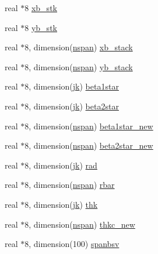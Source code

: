 \begin{DoxyCompactItemize}
\item 
real $\ast$8 \hyperlink{namespaceglobvar_ab9824c9f8dcc0e337df800037acfff86}{xb\+\_\+stk}
\item 
real $\ast$8 \hyperlink{namespaceglobvar_a50b0561e08ecd21444c8d0138e8f23f8}{yb\+\_\+stk}
\item 
real $\ast$8, dimension(\hyperlink{namespaceglobvar_adeb7d084c25deee7802eab03d40830c5}{nspan}) \hyperlink{namespaceglobvar_ac7d10e840db27451a3d4f7281e998936}{xb\+\_\+stack}
\item 
real $\ast$8, dimension(\hyperlink{namespaceglobvar_adeb7d084c25deee7802eab03d40830c5}{nspan}) \hyperlink{namespaceglobvar_ab911e9efe95d91973d67032e07c25b6e}{yb\+\_\+stack}
\item 
real $\ast$8, dimension(\hyperlink{namespaceglobvar_a63113b636acdd2b247b3e2df6cdac555}{jk}) \hyperlink{namespaceglobvar_abb730f89383edc04d1631f6dc16ad5c6}{beta1star}
\item 
real $\ast$8, dimension(\hyperlink{namespaceglobvar_a63113b636acdd2b247b3e2df6cdac555}{jk}) \hyperlink{namespaceglobvar_a1504d995004c2c3cd93ac71f6c9028e0}{beta2star}
\item 
real $\ast$8, dimension(\hyperlink{namespaceglobvar_adeb7d084c25deee7802eab03d40830c5}{nspan}) \hyperlink{namespaceglobvar_a9b66a28ec78457551885e4ad3091f8fe}{beta1star\+\_\+new}
\item 
real $\ast$8, dimension(\hyperlink{namespaceglobvar_adeb7d084c25deee7802eab03d40830c5}{nspan}) \hyperlink{namespaceglobvar_aa2687515a32abc133ab720b0690976ba}{beta2star\+\_\+new}
\item 
real $\ast$8, dimension(\hyperlink{namespaceglobvar_a63113b636acdd2b247b3e2df6cdac555}{jk}) \hyperlink{namespaceglobvar_a66d44e4ebb72e4d0700987fd6cff1e02}{rad}
\item 
real $\ast$8, dimension(\hyperlink{namespaceglobvar_adeb7d084c25deee7802eab03d40830c5}{nspan}) \hyperlink{namespaceglobvar_aa830e5df47d2204dc7cfc6ad28e887df}{rbar}
\item 
real $\ast$8, dimension(\hyperlink{namespaceglobvar_a63113b636acdd2b247b3e2df6cdac555}{jk}) \hyperlink{namespaceglobvar_a72f67f1398b816e48706e6277e566566}{thk}
\item 
real $\ast$8, dimension(\hyperlink{namespaceglobvar_adeb7d084c25deee7802eab03d40830c5}{nspan}) \hyperlink{namespaceglobvar_a6e2bc84f532e605dfbeec7244ae6a981}{thkc\+\_\+new}
\item 
real $\ast$8, dimension(100) \hyperlink{namespaceglobvar_a6d99aeec6935f58b70f503a823d5f085}{spanbsv}
\item 

\end{DoxyCompactItemize}
